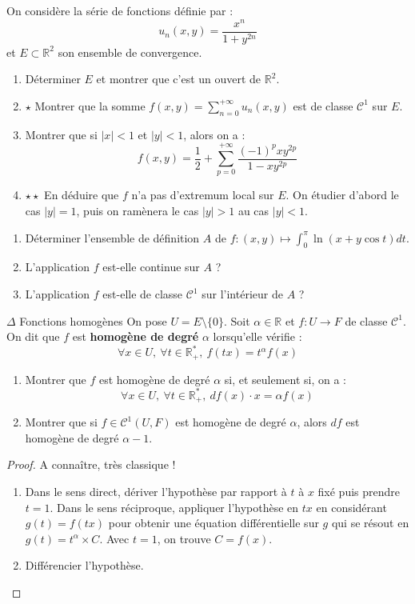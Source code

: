 \documentclass[french,a4paper]{article}
\newcommand{\R}{\mathbb{R}}
\newcommand{\st}{^*}
\theoremstyle{plain}
\theoremstyle{definition}
\theoremstyle{remark}
\begin{document}
\begin{ex}[Moulin.07]{}
	On considère la série de fonctions définie par : $$u_n(x,y)=\frac{x^n}{1+y^{2n}}$$ et $E\subset\R^2$ son ensemble de convergence.
	\begin{enumerate}
		\item Déterminer $E$ et montrer que c'est un ouvert de $\R^2$.
		\item $\star$ Montrer que la somme $f(x,y)=\displaystyle\sum_{n=0}^{+\infty}u_n(x,y)$ est de classe $\mathcal{C}^1$ sur $E$.
		\item Montrer que si $\lvert x\rvert<1$ et $\lvert y\rvert<1$, alors on a : $$f(x,y)=\frac{1}{2}+\sum_{p=0}^{+\infty}\frac{(-1)^pxy^{2p}}{1-xy^{2p}}$$
		\item $\star\star$ En déduire que $f$ n'a pas d'extremum local sur $E$. On étudier d'abord le cas $\lvert y\rvert=1$, puis on ramènera le cas $\lvert y\rvert>1$ au cas $\lvert y\rvert <1$.
	\end{enumerate}
\end{ex}

\begin{ex}[Moulin.08]{}
	\begin{enumerate}
		\item Déterminer l'ensemble de définition $A$ de $f:(x,y)\mapsto\displaystyle\int_{0}^{\pi}\ln(x+y\cos t)dt$.
		\item L'application $f$ est-elle continue sur $A$ ?
		\item L'application $f$ est-elle de classe $\mathcal{C}^1$ sur l'intérieur de $A$ ?
	\end{enumerate}
\end{ex}

\begin{ex}[Moulin.09]{$\Delta$ Fonctions homogènes}
	On pose $U=E\setminus\{0\}$. Soit $\alpha\in\R$ et $f:U\to F$ de classe $\mathcal{C}^1$. On dit que $f$ est \textbf{homogène de degré} $\alpha$ lorsqu'elle vérifie : $$\forall x\in U,\ \forall t\in\R_+\st,\ f(tx)=t^\alpha f(x)$$
	\begin{enumerate}
		\item Montrer que $f$ est homogène de degré $\alpha$ si, et seulement si, on a : $$\forall x\in U,\ \forall t\in\R_+\st,\ df(x)\cdot x=\alpha f(x)$$
		\item Montrer que si $f\in\mathcal{C}^1(U,F)$ est homogène de degré $\alpha$, alors $df$ est homogène de degré $\alpha-1$.
	\end{enumerate} 
\end{ex}
\begin{proof}
	A connaître, très classique !
	\begin{enumerate}
		\item Dans le sens direct, dériver l'hypothèse par rapport à $t$ à $x$ fixé puis prendre $t=1$. Dans le sens réciproque, appliquer l'hypothèse en $tx$ en considérant $g(t)=f(tx)$ pour obtenir une équation différentielle sur $g$ qui se résout en $g(t)=t^\alpha\times C$. Avec $t=1$, on trouve $C=f(x)$.
		\item Différencier l'hypothèse.
	\end{enumerate}
\end{proof}
\end{document}
